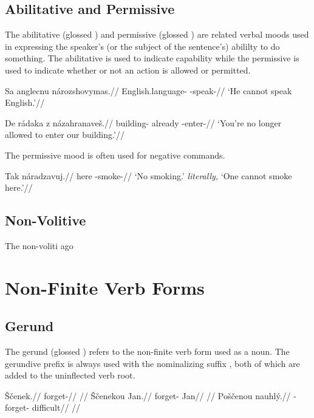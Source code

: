 \subsection{Abilitative and Permissive}
\par The abilitative (glossed ) and permissive (glossed ) are related verbal moods used in expressing the speaker's (or the subject of the sentence's) abililty to do something. The abilitative is used to indicate capability while the permissive is used to indicate whether or not an action is allowed or permitted.

\pex
\begingl
\gla Sa anglecnu nározshovymas.//
\glb {} English.language- -speak-//
\glft `He cannot speak English.'//
\endgl
\xe

\pex
\begingl
\gla De rádaka z názahranave\v{s}.//
\glb {} building- already -enter-//
\glft `You're no longer allowed to enter our building.'//
\endgl
\xe

\par The permissive mood is often used for negative commands.

\pex
\begingl
\gla Tak náradzavuj.//
\glb here -smoke-//
\glft `No smoking.' \textit{literally,} `One cannot smoke here.'//
\endgl
\xe

\subsection{Non-Volitive}
\par The non-voliti
\ex[exno={\getref{vasebroke}, rep.}]
ago
\xe
\section{Non-Finite Verb Forms}

\subsection{Gerund}
\par The gerund (glossed ) refers to the non-finite verb form used as a noun. The gerundive prefix  is always used with the nominalizing suffix , both of which are added to the uninflected verb root.

\pex
\a
\begingl
\gla \v{S}\v{c}enek.//
\glb forget-//
\glft {}//
\endgl
\a
\begingl
\gla \v{S}\v{c}enekou Jan.//
\glb forget- Jan//
\glft {}//
\endgl
\a
\begingl
\gla Po\v{s}\v{c}enou nauhl\'y.//
\glb {}-forget- difficult//
\glft {}//
\endgl
\xe

